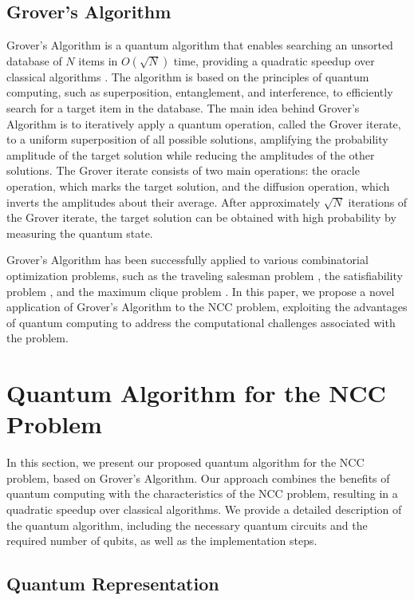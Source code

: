 \subsection{Grover's Algorithm}

Grover's Algorithm is a quantum algorithm that enables searching an unsorted database of $N$ items in $O(\sqrt{N})$ time, providing a quadratic speedup over classical algorithms \cite{Grover}. The algorithm is based on the principles of quantum computing, such as superposition, entanglement, and interference, to efficiently search for a target item in the database. The main idea behind Grover's Algorithm is to iteratively apply a quantum operation, called the Grover iterate, to a uniform superposition of all possible solutions, amplifying the probability amplitude of the target solution while reducing the amplitudes of the other solutions. The Grover iterate consists of two main operations: the oracle operation, which marks the target solution, and the diffusion operation, which inverts the amplitudes about their average. After approximately $\sqrt{N}$ iterations of the Grover iterate, the target solution can be obtained with high probability by measuring the quantum state.

Grover's Algorithm has been successfully applied to various combinatorial optimization problems, such as the traveling salesman problem \cite{Grover_TSP}, the satisfiability problem \cite{Grover_SAT}, and the maximum clique problem \cite{Grover_clique}. In this paper, we propose a novel application of Grover's Algorithm to the NCC problem, exploiting the advantages of quantum computing to address the computational challenges associated with the problem.


\section{Quantum Algorithm for the NCC Problem} \label{sec:algorithm}

In this section, we present our proposed quantum algorithm for the NCC problem, based on Grover's Algorithm. Our approach combines the benefits of quantum computing with the characteristics of the NCC problem, resulting in a quadratic speedup over classical algorithms. We provide a detailed description of the quantum algorithm, including the necessary quantum circuits and the required number of qubits, as well as the implementation steps.

\subsection{Quantum Representation}

